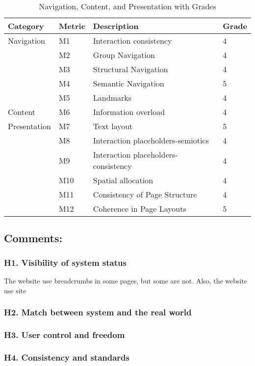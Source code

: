 \begin{table}[ht]
	\centering
	\caption{Navigation, Content, and Presentation with Grades}
	\begin{tabular}{|l|l|l|l|}
		\hline
		\textbf{Category} & \textbf{Metric} & \textbf{Description} & \textbf{Grade} \\
		\hline
		Navigation & M1 & Interaction consistency & 4 \\
		\hline
		& M2 & Group Navigation & 4 \\
		\hline
		& M3 & Structural Navigation & 4 \\
		\hline
		& M4 & Semantic Navigation & 5 \\
		\hline
		& M5 & Landmarks & 4 \\
		\hline
		Content    & M6 & Information overload & 4 \\
		\hline
		Presentation & M7 & Text layout & 5 \\
		\hline
		& M8 & Interaction placeholders-semiotics & 4 \\
		\hline
		& M9 & Interaction placeholders-consistency & 4 \\
		\hline
		& M10 & Spatial allocation & 4 \\
		\hline
		& M11 & Consistency of Page Structure & 4 \\
		\hline
		& M12 & Coherence in Page Layouts & 5 \\
		\hline
	\end{tabular}
\end{table}

\subsection{Comments:}
\subsubsection{H1. Visibility of system status}
The website use breadcrumbs in some pages, but some are not. Also, the website use site

\subsubsection{H2. Match between system and the real world}
\subsubsection{H3. User control and freedom }
\subsubsection{H4. Consistency and standards}

